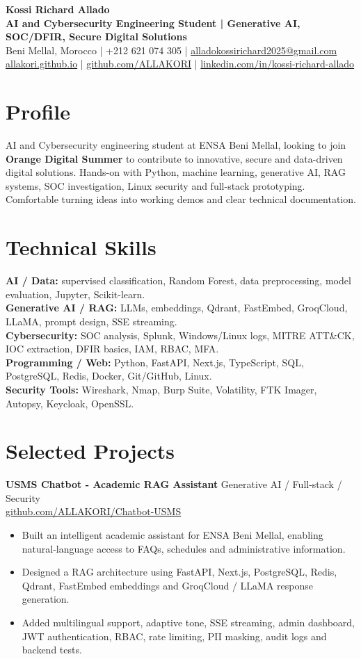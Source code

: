 \documentclass[10pt,a4paper]{article}
\begin{document}
{\Large \textbf{Kossi Richard Allado}}\\
\textbf{AI and Cybersecurity Engineering Student | Generative AI, SOC/DFIR, Secure Digital Solutions}\\
Beni Mellal, Morocco | +212 621 074 305 | \href{mailto:alladokossirichard2025@gmail.com}{alladokossirichard2025@gmail.com}\\
\href{https://allakori.github.io/}{allakori.github.io} | \href{https://github.com/ALLAKORI}{github.com/ALLAKORI} | \href{https://www.linkedin.com/in/kossi-richard-allado-50177b2a5}{linkedin.com/in/kossi-richard-allado}

\section{Profile}
AI and Cybersecurity engineering student at ENSA Beni Mellal, looking to join \textbf{Orange Digital Summer} to contribute to innovative, secure and data-driven digital solutions. Hands-on with Python, machine learning, generative AI, RAG systems, SOC investigation, Linux security and full-stack prototyping. Comfortable turning ideas into working demos and clear technical documentation.

\section{Technical Skills}
\textbf{AI / Data:} supervised classification, Random Forest, data preprocessing, model evaluation, Jupyter, Scikit-learn.\\
\textbf{Generative AI / RAG:} LLMs, embeddings, Qdrant, FastEmbed, GroqCloud, LLaMA, prompt design, SSE streaming.\\
\textbf{Cybersecurity:} SOC analysis, Splunk, Windows/Linux logs, MITRE ATT\&CK, IOC extraction, DFIR basics, IAM, RBAC, MFA.\\
\textbf{Programming / Web:} Python, FastAPI, Next.js, TypeScript, SQL, PostgreSQL, Redis, Docker, Git/GitHub, Linux.\\
\textbf{Security Tools:} Wireshark, Nmap, Burp Suite, Volatility, FTK Imager, Autopsy, Keycloak, OpenSSL.

\section{Selected Projects}
\textbf{USMS Chatbot - Academic RAG Assistant} \hfill Generative AI / Full-stack / Security\\
\href{https://github.com/ALLAKORI/Chatbot-USMS}{github.com/ALLAKORI/Chatbot-USMS}
\begin{itemize}
  \item Built an intelligent academic assistant for ENSA Beni Mellal, enabling natural-language access to FAQs, schedules and administrative information.
  \item Designed a RAG architecture using FastAPI, Next.js, PostgreSQL, Redis, Qdrant, FastEmbed embeddings and GroqCloud / LLaMA response generation.
  \item Added multilingual support, adaptive tone, SSE streaming, admin dashboard, JWT authentication, RBAC, rate limiting, PII masking, audit logs and backend tests.
\end{itemize}
\end{document}
